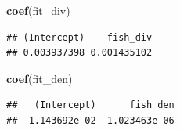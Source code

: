 \documentclass[]{article}
\newenvironment{Shaded}{\begin{snugshade}}{\end{snugshade}}
\newcommand{\KeywordTok}[1]{\textcolor[rgb]{0.13,0.29,0.53}{\textbf{#1}}}
\newcommand{\NormalTok}[1]{#1}
\begin{document}
\begin{Shaded}
\begin{Highlighting}[]
\KeywordTok{coef}\NormalTok{(fit_div)}
\end{Highlighting}
\end{Shaded}

\begin{verbatim}
## (Intercept)    fish_div 
## 0.003937398 0.001435102
\end{verbatim}

\begin{Shaded}
\begin{Highlighting}[]
\KeywordTok{coef}\NormalTok{(fit_den)}
\end{Highlighting}
\end{Shaded}

\begin{verbatim}
##   (Intercept)      fish_den 
##  1.143692e-02 -1.023463e-06
\end{verbatim}
\end{document}
